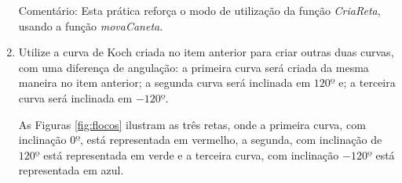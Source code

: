 \begin{renumerate}
\begin{enumerate}[label=(\alph*)]
  \label{ex:cap03_ex27}
      Comentário: Esta prática reforça o modo de utilização da função \emph{CriaReta}, usando a função \emph{movaCaneta}.
%

      \item 
      Utilize a curva de Koch criada no item anterior para criar outras duas curvas, com uma diferença de angulação: a primeira curva será criada da mesma maneira no item anterior; a segunda curva será inclinada em $120º$ e; a terceira curva será inclinada em $-120º$. 

      As Figuras \ref{fig:flocos} ilustram as três retas, onde a primeira curva, com inclinação $0º$, está representada em vermelho, a segunda, com inclinação de $120º$ está representada em verde e a terceira curva, com inclinação $-120º$ está representada em azul.
      \label{ex:cap04_ex3b}


\end{enumerate}
\end{renumerate}
